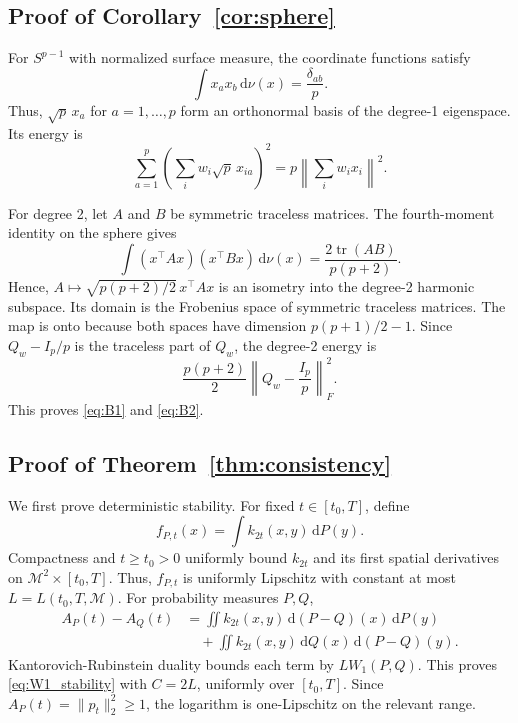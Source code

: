 \documentclass[twoside]{article}
\theoremstyle{definition}
\theoremstyle{remark}
\DeclareMathOperator{\tr}{tr}
\newcommand{\M}{\mathcal{M}}
\newcommand{\dd}{\,\mathrm{d}}
\begin{document}
\subsection{Proof of Corollary~\ref{cor:sphere}}
\label{app:sphere}
For $S^{p-1}$ with normalized surface measure, the coordinate functions satisfy
\begin{equation*}
  \int x_ax_b\dd\nu(x)=\frac{\delta_{ab}}{p}.
\end{equation*}
Thus, $\sqrt p\,x_a$ for $a=1,\ldots,p$ form an orthonormal basis of the degree-1 eigenspace. Its energy is
\begin{equation*}
  \sum_{a=1}^p\left(\sum_iw_i\sqrt p\,x_{ia}\right)^2=p\left\|\sum_iw_ix_i\right\|^2.
\end{equation*}

For degree 2, let $A$ and $B$ be symmetric traceless matrices. The fourth-moment identity on the sphere gives
\begin{equation*}
  \int (x^\top A x)(x^\top Bx)\dd\nu(x)
  =\frac{2\tr(AB)}{p(p+2)}.
\end{equation*}
Hence, $A\mapsto \sqrt{p(p+2)/2}\,x^\top A x$ is an isometry into the degree-2 harmonic subspace. Its domain is the Frobenius space of symmetric traceless matrices. The map is onto because both spaces have dimension $p(p+1)/2-1$. Since $Q_w-I_p/p$ is the traceless part of $Q_w$, the degree-2 energy is
\begin{equation*}
  \frac{p(p+2)}{2}\left\|Q_w-\frac{I_p}{p}\right\|_F^2.
\end{equation*}
This proves \eqref{eq:B1} and \eqref{eq:B2}.


\subsection{Proof of Theorem~\ref{thm:consistency}}
\label{app:weighted_rate}
We first prove deterministic stability. For fixed $t\in[t_0,T]$, define
\begin{equation*}
  f_{P,t}(x)=\int k_{2t}(x,y)\dd P(y).
\end{equation*}
Compactness and $t\ge t_0>0$ uniformly bound $k_{2t}$ and its first spatial derivatives on $\M^2\times[t_0,T]$. Thus, $f_{P,t}$ is uniformly Lipschitz with constant at most $L=L(t_0,T,\M)$. For probability measures $P,Q$,
\begin{align*}
  A_P(t)-A_Q(t)
  &=\iint k_{2t}(x,y)\dd(P-Q)(x)\dd P(y) \\
  &\quad+\iint k_{2t}(x,y)\dd Q(x)\dd(P-Q)(y).
\end{align*}
Kantorovich-Rubinstein duality bounds each term by $L W_1(P,Q)$. This proves \eqref{eq:W1_stability} with $C=2L$, uniformly over $[t_0,T]$. Since $A_P(t)=\|p_t\|_2^2\ge1$, the logarithm is one-Lipschitz on the relevant range.
\end{document}
